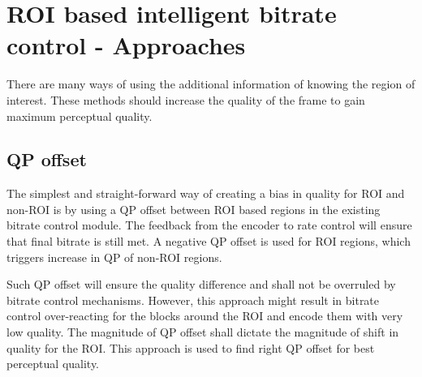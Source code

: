 \documentclass[11pt]{article} %
\begin{document}
\section{ROI based intelligent bitrate control - Approaches}
There are many ways of using the additional information of knowing the region of interest. These methods should increase the quality of the frame to gain maximum perceptual quality.
\subsection{QP offset}
The simplest and straight-forward way of creating a bias in quality for ROI and non-ROI is by using a QP offset between ROI based regions in the existing bitrate control module. The feedback from the encoder to rate control will ensure that final bitrate is still met. A negative QP offset  is used for ROI regions, which triggers increase in QP of non-ROI regions. 

Such QP offset will ensure the quality difference and shall not be overruled by bitrate control mechanisms. However, this approach might result in bitrate control over-reacting for the blocks around the ROI and encode them with very low quality. The magnitude of QP offset shall dictate the magnitude of shift in quality for the ROI. This approach is used to find right QP offset for best perceptual quality. 
\end{document}
